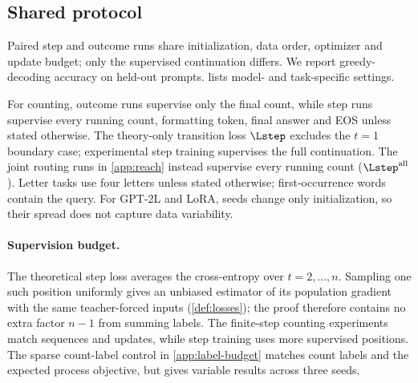 \subsection{Shared protocol}
\label{app:letter-protocol}
Paired step and outcome runs share initialization, data order, optimizer and update budget; only the supervised continuation differs.
We report greedy-decoding accuracy on held-out prompts.  lists model- and task-specific settings.

\begin{table}[H]
\centering\small
{}
\caption{\textbf{Shared experimental settings.} Task-specific exceptions are stated in the corresponding subsections.}
\label{tab:protocol}
\end{table}

For counting, outcome runs supervise only the final count, while step runs supervise every running count, formatting token,
final answer and EOS unless stated otherwise. The theory-only transition loss $\Lstep$ excludes the $t=1$ boundary case;
experimental step training supervises the full continuation. The joint routing runs in \cref{app:reach} instead supervise
every running count ($\Lstep^{\mathrm{all}}$). Letter tasks use four letters unless stated otherwise; first-occurrence words contain the query.
For GPT-2L and LoRA, seeds change only initialization, so their spread does not capture data variability.

\paragraph{Supervision budget.}
The theoretical step loss averages the cross-entropy over $t=2,\ldots,n$.
Sampling one such position uniformly gives an unbiased estimator of its population
gradient with the same teacher-forced inputs (\cref{def:losses}); the proof therefore
contains no extra factor $n-1$ from summing labels. The finite-step counting experiments
match sequences and updates, while step training uses more supervised positions.
The sparse count-label control in \cref{app:label-budget} matches count labels
and the expected process objective, but gives variable results across three seeds.


